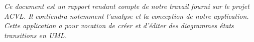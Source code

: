 \textit{
	Ce document est un rapport rendant compte de notre travail fourni sur le projet ACVL. Il contiendra notemment l'analyse et la conception de notre application. Cette application a pour vocation de créer et d'éditer des diagrammes états transitions en UML.
}
\newpage